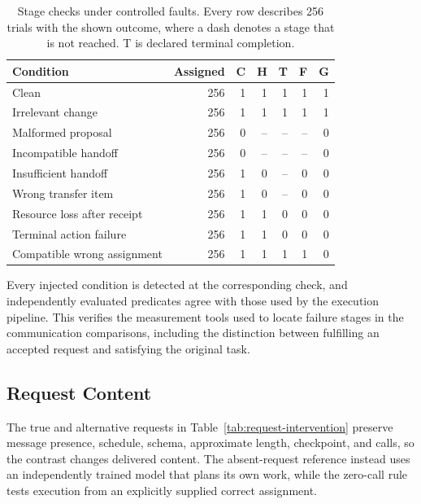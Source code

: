 \documentclass[sigconf,nonacm,balance=false]{aamas}
\newcommand{\tabstyle}{\small\setlength{\tabcolsep}{3pt}\renewcommand{\arraystretch}{1.10}}
\begin{document}
\begin{table}[!htbp]
\centering\tabstyle
\caption{Stage checks under controlled faults. Every row describes 256 trials with the shown outcome, where a dash denotes a stage that is not reached. T is declared terminal completion.}
\label{tab:fault-stages}
\begin{tabular}{@{}lrrrrrr@{}}\toprule
Condition & Assigned & C & H & T & F & G\\\midrule
Clean & 256 & 1 & 1 & 1 & 1 & 1\\
Irrelevant change & 256 & 1 & 1 & 1 & 1 & 1\\
Malformed proposal & 256 & 0 & -- & -- & -- & 0\\
Incompatible handoff & 256 & 0 & -- & -- & -- & 0\\
Insufficient handoff & 256 & 1 & 0 & -- & 0 & 0\\
Wrong transfer item & 256 & 1 & 0 & -- & 0 & 0\\
Resource loss after receipt & 256 & 1 & 1 & 0 & 0 & 0\\
Terminal action failure & 256 & 1 & 1 & 0 & 0 & 0\\
Compatible wrong assignment & 256 & 1 & 1 & 1 & 1 & 0\\\bottomrule
\end{tabular}
\end{table}

Every injected condition is detected at the corresponding check, and independently evaluated predicates agree with those used by the execution pipeline. This verifies the measurement tools used to locate failure stages in the communication comparisons, including the distinction between fulfilling an accepted request and satisfying the original task.

\subsection{Request Content}
\label{sec:supp-request}

The true and alternative requests in Table~\ref{tab:request-intervention} preserve message presence, schedule, schema, approximate length, checkpoint, and calls, so the contrast changes delivered content. The absent-request reference instead uses an independently trained model that plans its own work, while the zero-call rule tests execution from an explicitly supplied correct assignment.
\end{document}
